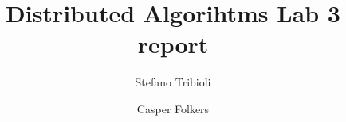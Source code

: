 \documentclass{article}
\begin{document}
\title{Distributed Algorihtms Lab 3 report}
\author{Stefano Tribioli \and Casper Folkers}
\maketitle



\end{document}

